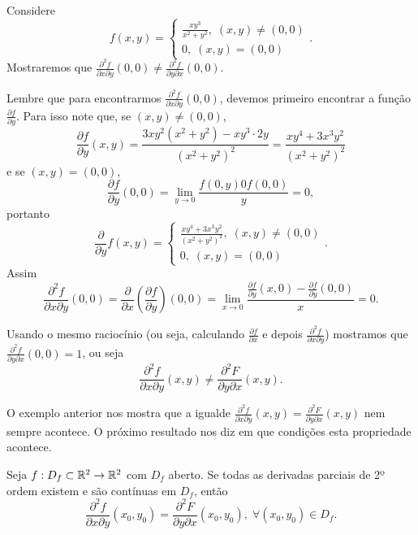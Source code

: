 \begin{example}
    Considere \[f(x,y) = \begin{cases}
        \frac{xy^3}{x^2 + y^2},\; (x,y)\neq(0,0) \\
        0,\; (x,y)=(0,0)
    \end{cases}.\] Mostraremos que \(\frac{\partial^2 f}{\partial x \partial y} (0,0) \neq \frac{\partial^2 f}{\partial y \partial x}(0,0).\)

    Lembre que para encontrarmos \(\frac{\partial^2 f}{\partial x \partial y}(0,0)\), devemos primeiro encontrar a função \(\frac{\partial f}{\partial y}\). Para isso note que, se \((x,y)\neq (0,0)\), \[\frac{\partial f}{\partial y}(x,y) = \frac{3xy^2(x^2+y^2) - xy^3\cdot 2y}{(x^2 + y^2)^2} = \frac{xy^4 + 3x^3 y^2}{(x^2+y^2)^2}\] e se \((x,y) = (0,0)\), \[\frac{\partial f}{\partial y}(0,0) = \lim_{y\to 0} \frac{f(0,y) 0 f(0,0)}{y} = 0,\] portanto \[\frac{\partial}{\partial y}f(x,y) = \begin{cases}
        \frac{xy^4 + 3x^3 y^2}{(x^2+y^2)^2},\; (x,y)\neq(0,0) \\
        0,\; (x,y) = (0,0)
    \end{cases}.\] Assim \[\frac{\partial^2 f}{\partial x \partial y}(0,0) = \frac{\partial}{\partial x}\left( \frac{\partial f}{\partial y} \right)(0,0) = \lim_{x\to 0} \frac{\frac{\partial f}{\partial y}(x,0) - \frac{\partial f}{\partial y}(0,0)}{x} = 0.\]

    Usando o mesmo raciocínio (ou seja, calculando \(\frac{\partial f}{\partial x}\) e depois \(\frac{\partial^2 f}{\partial x \partial y}\)) mostramos que \(\frac{\partial^2 f}{\partial y\partial x}(0,0) = 1\), ou seja \[\frac{\partial^2 f}{\partial x \partial y}(x,y) \neq \frac{\partial^2 F}{\partial y \partial x}(x,y).\]
\end{example}

O exemplo anterior nos mostra que a igualde \(\frac{\partial^2 f}{\partial x \partial y}(x,y) = \frac{\partial^2 F}{\partial y \partial x}(x,y)\) nem sempre acontece. O próximo resultado nos diz em que condições esta propriedade acontece.

\begin{theorem}[Schwarz]
    Seja \(f:D_f\subset\mathbb{R}^2 \to \mathbb{R}^2\) com \(D_f\) aberto. Se todas as derivadas parciais de 2º ordem existem e são contínuas em \(D_f\), então \[\frac{\partial^2 f}{\partial x \partial y}(x_0,y_0) = \frac{\partial^2 F}{\partial y \partial x}(x_0,y_0),\; \forall (x_0,y_0)\in D_f.\]
\end{theorem}

